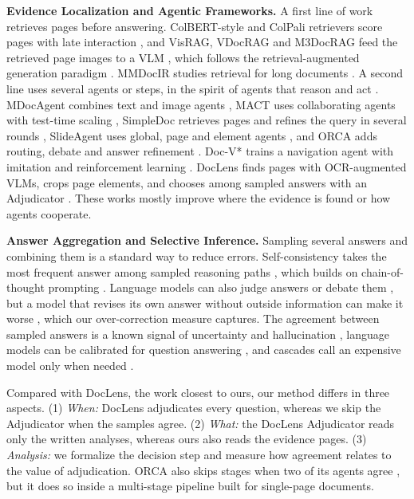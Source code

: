 \documentclass[pdflatex,sn-basic]{sn-jnl}%
\theoremstyle{thmstyletwo}%
\begin{document}
\textbf{Evidence Localization and Agentic Frameworks.} A first line of work retrieves pages before answering. ColBERT-style and ColPali retrievers score pages with late interaction \cite{santhanam2022colbertv2,faysse2024colpali}, and VisRAG, VDocRAG and M3DocRAG feed the retrieved page images to a VLM \cite{yu2024visrag,tanaka2025vdocrag,cho2024m3docrag}, which follows the retrieval-augmented generation paradigm \cite{gao2023rag}. MMDocIR studies retrieval for long documents \cite{dong2025mmdocir}. A second line uses several agents or steps, in the spirit of agents that reason and act \cite{yao2023react}. MDocAgent combines text and image agents \cite{han2025mdocagent}, MACT uses collaborating agents with test-time scaling \cite{yu2025mact}, SimpleDoc retrieves pages and refines the query in several rounds \cite{jain2025simpledoc}, SlideAgent uses global, page and element agents \cite{slideagent}, and ORCA adds routing, debate and answer refinement \cite{orca}. Doc-V* trains a navigation agent with imitation and reinforcement learning \cite{docvstar}. DocLens finds pages with OCR-augmented VLMs, crops page elements, and chooses among sampled answers with an Adjudicator \cite{zhu2025doclens}. These works mostly improve where the evidence is found or how agents cooperate.

\textbf{Answer Aggregation and Selective Inference.} Sampling several answers and combining them is a standard way to reduce errors. Self-consistency takes the most frequent answer among sampled reasoning paths \cite{wang2023selfconsistency}, which builds on chain-of-thought prompting \cite{wei2022cot}. Language models can also judge answers \cite{zheng2023judging} or debate them \cite{du2024debate}, but a model that revises its own answer without outside information can make it worse \cite{huang2024selfcorrect}, which our over-correction measure captures. The agreement between sampled answers is a known signal of uncertainty and hallucination \cite{kuhn2023semantic,manakul2023selfcheckgpt}, language models can be calibrated for question answering \cite{jiang2021calibration,kadavath2022lm}, and cascades call an expensive model only when needed \cite{chen2024frugalgpt}.

Compared with DocLens, the work closest to ours, our method differs in three aspects. (1) \emph{When:} DocLens adjudicates every question, whereas we skip the Adjudicator when the samples agree. (2) \emph{What:} the DocLens Adjudicator reads only the written analyses, whereas ours also reads the evidence pages. (3) \emph{Analysis:} we formalize the decision step and measure how agreement relates to the value of adjudication. ORCA also skips stages when two of its agents agree \cite{orca}, but it does so inside a multi-stage pipeline built for single-page documents.
\end{document}
